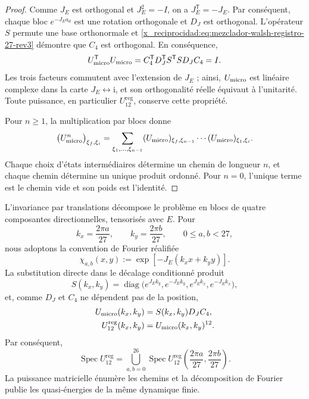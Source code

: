 \begin{proof}
Comme \(J_E\) est orthogonal et \(J_E^2=-I\), on a
\(J_E^{\mathsf T}=-J_E\). Par conséquent, chaque bloc
\(e^{-J_Ea_d}\) est une rotation orthogonale et \(D_J\) est orthogonal.
L’opérateur \(S\) permute une base orthonormale et
\eqref{x_reciprocidad:eq:mezclador-walsh-registro-27-rev3} démontre que \(C_4\) est
orthogonal. En conséquence,
\[
 U_{\rm micro}^{\mathsf T}U_{\rm micro}
 =C_4^{\mathsf T}D_J^{\mathsf T}S^{\mathsf T}
   S D_JC_4
 =I.
\]
Les trois facteurs commutent avec l’extension de \(J_E\) ; ainsi,
\(U_{\rm micro}\) est linéaire complexe dans la carte
\(J_E\leftrightarrow\mathrm i\), et son orthogonalité réelle équivaut à
l’unitarité. Toute puissance, en particulier
\(U_{12}^{\mathrm{reg}}\), conserve cette propriété.


Pour \(n\geq1\), la multiplication par blocs donne
\[
 \bigl(U_{\rm micro}^{n}\bigr)_{\xi_f,\xi_i}
 =
 \sum_{\xi_1,\ldots,\xi_{n-1}}
 (U_{\rm micro})_{\xi_f,\xi_{n-1}}
 \cdots
 (U_{\rm micro})_{\xi_1,\xi_i}.
\]
Chaque choix d'états intermédiaires détermine un chemin de longueur \(n\), et chaque chemin détermine un unique produit ordonné. Pour \(n=0\), l'unique terme est le chemin vide et son poids est l'identité.
\end{proof}

L’invariance par translations décompose le problème en blocs de quatre
composantes directionnelles, tensorisés avec \(E\). Pour
\[
 k_x=\frac{2\pi a}{27},
 \qquad
 k_y=\frac{2\pi b}{27},
 \qquad 0\leq a,b<27,
\]
nous adoptons la convention de Fourier réalifiée
\[
 \chi_{a,b}(x,y)
 :=\exp[-J_E(k_xx+k_yy)].
\]
La substitution directe dans le décalage conditionné produit
\[
 S(k_x,k_y)
 =\operatorname{diag}
 \bigl(
  e^{J_Ek_y},e^{-J_Ek_y},
  e^{J_Ek_x},e^{-J_Ek_x}
 \bigr),
\]
et, comme \(D_J\) et \(C_4\) ne dépendent pas de la position,
\begin{equation}
 \begin{aligned}
 U_{\rm micro}(k_x,k_y)
   &=S(k_x,k_y)D_JC_4,\\
 U_{12}^{\mathrm{reg}}(k_x,k_y)
   &=U_{\rm micro}(k_x,k_y)^{12}.
 \end{aligned}
 \label{x_reciprocidad:eq:bloques-fourier-registro-27-rev3}
\end{equation}
Par conséquent,
\[
 \operatorname{Spec}U_{12}^{\mathrm{reg}}
 =
 \bigcup_{a,b=0}^{26}
 \operatorname{Spec}
 U_{12}^{\mathrm{reg}}
 \left(\frac{2\pi a}{27},\frac{2\pi b}{27}\right).
\]
La puissance matricielle énumère les chemins et la décomposition de Fourier publie
les quasi-énergies de la même dynamique finie.


